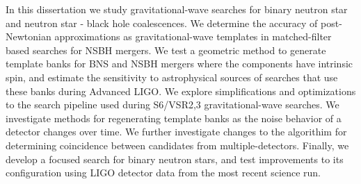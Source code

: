
In this dissertation we study gravitational-wave searches for 
binary neutron star and neutron star - black hole coalescences. 
We determine the accuracy of post-Newtonian approximations as gravitational-wave
templates in matched-filter based searches for NSBH mergers.
We test a geometric method to generate template banks for BNS and NSBH mergers where
the components have intrinsic spin, and estimate the sensitivity to
astrophysical sources of searches that use these banks during Advanced LIGO.
We explore simplifications and optimizations to the search pipeline used 
during S6/VSR2,3 gravitational-wave searches. We investigate methods for regenerating
template banks as the noise behavior of a detector changes over time. We further
investigate changes to the algorithim for determining coincidence between
candidates from multiple-detectors.
Finally, we develop a focused search for binary neutron stars, and test improvements
to its configuration using LIGO detector data from the most recent science
run.
